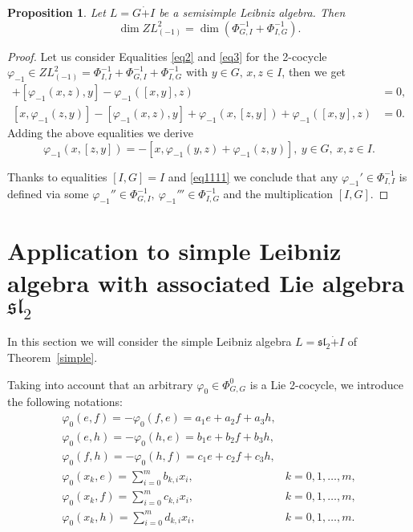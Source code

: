 \documentclass[12pt,reqno]{amsart}
\newtheorem{prop}[thm]{Proposition}
\numberwithin{equation}{section}
\begin{document}
\begin{prop}  Let $L=G\dot{+}I$ be a semisimple Leibniz algebra. Then
\[\dim ZL^2_{(-1)}=\dim (\Phi_{G,I}^{-1}+\Phi_{I,G}^{-1}).\]
\end{prop}
\begin{proof} Let us consider Equalities \eqref{eq2} and \eqref{eq3} for the 2-cocycle $\varphi_{-1}\in ZL^2_{(-1)}=\Phi_{I,I}^{-1}+ \Phi_{G,I}^{-1}+\Phi_{I,G}^{-1}$ with
$y \in G, \, x, z\in I$, then we get
\begin{align*}
[x,\varphi_{-1}(y,z)] +[\varphi_{-1}(x,z), y] - \varphi_{-1}([x,y],z)&=0,\\
[x,\varphi_{-1}(z,y)] - [\varphi_{-1}(x,z), y] + \varphi_{-1}(x, [z,y]) + \varphi_{-1}([x,y],z)&=0.
\end{align*}
Adding the above equalities we derive
\begin{equation} \label{eq1111}
\varphi_{-1}(x,
[z,y])=-[x,\varphi_{-1}(y,z)+\varphi_{-1}(z,y)], \ y\in G, \ x, z\in I.
\end{equation}

Thanks to equalities $[I,G]=I$ and \eqref{eq1111} we conclude that any $\varphi_{-1}'\in \Phi_{I,I}^{-1}$ is defined via
 some $\varphi_{-1}''\in \Phi_{G,I}^{-1}, \ \varphi_{-1}'''\in \Phi_{I,G}^{-1}$ and the multiplication $[I,G]$.
\end{proof}

\section{Application to simple Leibniz algebra with associated Lie algebra $\mathfrak{sl}_2$}

In this section we will consider  the simple Leibniz algebra $L= \mathfrak{sl}_2\dot{+}I$ of Theorem~\ref{simple}.

Taking into account that an arbitrary $\varphi_0\in \Phi_{G,G}^0$ is a Lie 2-cocycle, we introduce the following notations:
\[ \begin{array}{ll}
\varphi_0(e,f) = - \varphi_0(f,e) = a_{1}e+a_{2}f+a_{3}h, &\\[1mm]
\varphi_0(e,h) = - \varphi_0(h,e) = b_{1}e+b_{2}f+b_{3}h, &\\[1mm]
\varphi_0(f,h) = - \varphi_0(h,f) = c_{1}e+c_{2}f+c_{3}h, &\\[1mm]
\varphi_{0}(x_k,e) = \sum\limits_{i=0}^{m}b_{k,i}x_i, &   k=0,1,\dots,m, \\[1mm]
\varphi_{0}(x_k,f) = \sum\limits_{i=0}^{m}c_{k,i}x_i, &   k=0,1,\dots,m, \\[1mm]
\varphi_{0}(x_k,h) = \sum\limits_{i=0}^{m}d_{k,i}x_i, &   k=0,1,\dots,m. \\[1mm]
\end{array} \]
\end{document}
